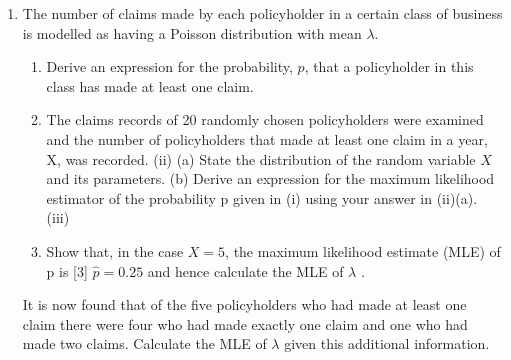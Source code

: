 \documentclass[a4paper,12pt]{article}
\begin{document}
\begin{enumerate}
\item
The number of claims made by each policyholder in a certain class of business is
modelled as having a Poisson distribution with mean $\lambda$.

\begin{enumerate}
\item Derive an expression for the probability, $p$, that a policyholder in this class has made at least one claim.
\item The claims records of 20 randomly chosen policyholders were examined and the number of policyholders that made at least one claim in a year, X, was recorded.
(ii)
(a) State the distribution of the random variable $X$ and its parameters.
(b) Derive an expression for the maximum likelihood estimator of the
probability p given in (i) using your answer in (ii)(a).
(iii)
\item Show that, in the case $X = 5$, the maximum likelihood estimate (MLE) of p is
[3]
$\hat{p} = 0.25$ and hence calculate the MLE of $\lambda$ .
\end{enumerate}
It is now found that of the five policyholders who had made at least one claim there were four who had made exactly one claim and one who had made two claims.
Calculate the MLE of $\lambda$ given this additional information.
\end{enumerate}

\newpage
\end{document}
